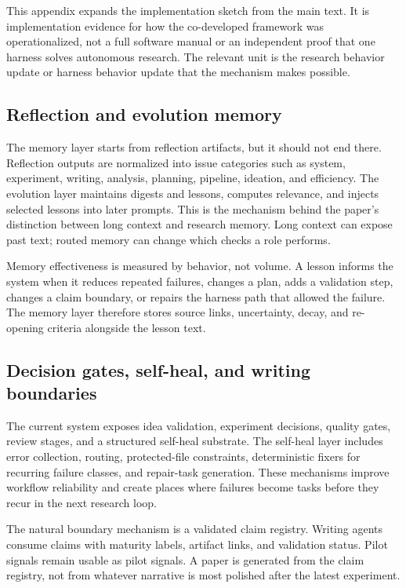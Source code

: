 \documentclass{article}
\begin{document}
This appendix expands the implementation sketch from the main text. It is implementation evidence for how the co-developed framework was operationalized, not a full software manual or an independent proof that one harness solves autonomous research. The relevant unit is the research behavior update or harness behavior update that the mechanism makes possible.

\subsection{Reflection and evolution memory}

The memory layer starts from reflection artifacts, but it should not end there. Reflection outputs are normalized into issue categories such as system, experiment, writing, analysis, planning, pipeline, ideation, and efficiency. The evolution layer maintains digests and lessons, computes relevance, and injects selected lessons into later prompts. This is the mechanism behind the paper's distinction between long context and research memory. Long context can expose past text; routed memory can change which checks a role performs.

Memory effectiveness is measured by behavior, not volume. A lesson informs the system when it reduces repeated failures, changes a plan, adds a validation step, changes a claim boundary, or repairs the harness path that allowed the failure. The memory layer therefore stores source links, uncertainty, decay, and re-opening criteria alongside the lesson text.

\subsection{Decision gates, self-heal, and writing boundaries}

The current system exposes idea validation, experiment decisions, quality gates, review stages, and a structured self-heal substrate. The self-heal layer includes error collection, routing, protected-file constraints, deterministic fixers for recurring failure classes, and repair-task generation. These mechanisms improve workflow reliability and create places where failures become tasks before they recur in the next research loop.

The natural boundary mechanism is a validated claim registry. Writing agents consume claims with maturity labels, artifact links, and validation status. Pilot signals remain usable as pilot signals. A paper is generated from the claim registry, not from whatever narrative is most polished after the latest experiment.
\end{document}
